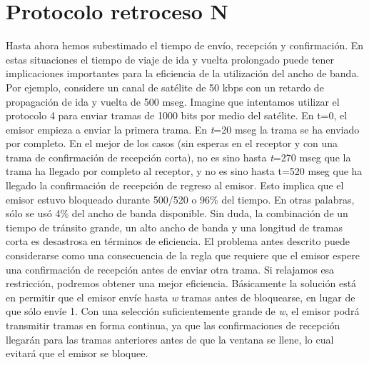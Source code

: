 \documentclass[
	12pt, %
	fleqn, %
	a4paper, %
	oneside, %
]{LegrandOrangeBook}
\begin{document}
\section{Protocolo retroceso N}
Hasta ahora hemos subestimado el tiempo de envío, recepción y confirmación. En estas situaciones el tiempo de viaje de ida y vuelta prolongado puede tener implicaciones importantes para la eficiencia de la utilización del ancho de banda. Por ejemplo, considere un canal de satélite de 50 kbps con un retardo de propagación de ida y vuelta de 500 mseg. Imagine que intentamos utilizar el protocolo 4 para enviar tramas de 1000 bits por medio del satélite. En t=0, el emisor empieza a enviar la primera trama. En \textit{t}=20 mseg la trama se ha enviado por completo. En el mejor de los casos (sin esperas en el receptor y con una trama de confirmación de recepción corta), no es sino hasta \textit{t}=270 mseg que la trama ha llegado por completo al receptor, y no es sino hasta t=520 mseg que ha llegado la confirmación de recepción de regreso al emisor. Esto implica que el emisor estuvo bloqueado durante 500/520 o 96\% del tiempo. En otras palabras, sólo se usó 4\% del ancho de banda disponible. Sin duda, la combinación de un tiempo de tránsito grande, un alto ancho de banda y una longitud de tramas corta es desastrosa en términos de eficiencia. El problema antes descrito puede considerarse como una consecuencia de la regla que requiere que el emisor espere una confirmación de recepción antes de enviar otra trama. Si relajamos esa restricción, podremos obtener una mejor eficiencia. Básicamente la solución está en permitir que el emisor envíe hasta \textit{w} tramas antes de bloquearse, en lugar de que sólo envíe 1. Con una selección suficientemente grande de \textit{w}, el emisor podrá transmitir tramas en forma continua, ya que las confirmaciones de recepción llegarán para las tramas anteriores antes de que la ventana se llene, lo cual evitará que el emisor se bloquee.
\end{document}
